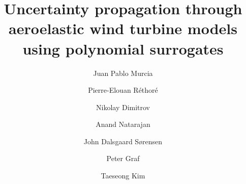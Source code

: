 \documentclass[preprint,12pt]{elsarticle}
\begin{document}
\begin{frontmatter}



\title{Uncertainty propagation through aeroelastic wind turbine models using polynomial surrogates}


\author[label0]{Juan Pablo Murcia}
\author[label1]{Pierre-Elouan R\'{e}thor\'{e}}
\author[label1]{Nikolay Dimitrov}
\author[label1]{Anand Natarajan}
\author[label2]{John Dalsgaard S{\o}rensen}
\author[label3]{Peter Graf}
\author[label1]{Taeseong Kim}

\address[label0]{jumu@dtu.dk, Department of Wind Energy, Technical University of Denmark}
\address[label1]{Department of Wind Energy, Technical University of Denmark}
\address[label2]{Department of Civil Engineering, Aalborg University}
\address[label3]{National Renewable Energy Laboratory, Colorado USA}


\end{frontmatter}
\end{document}
